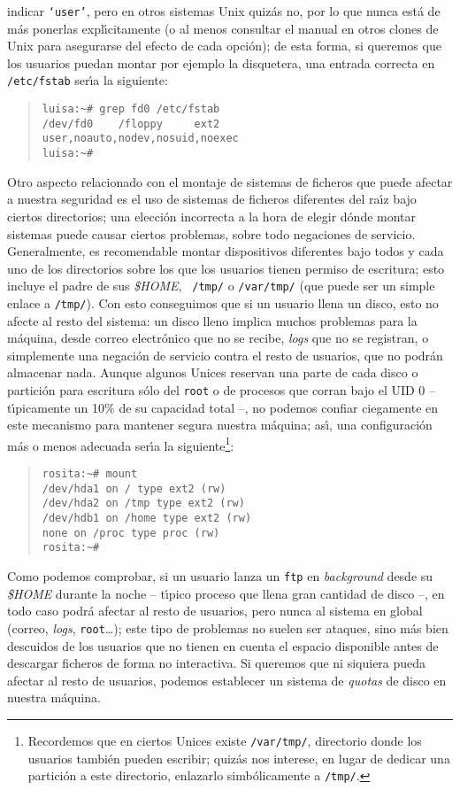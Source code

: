indicar {\tt `user'}, pero en otros sistemas Unix quiz\'as no, por lo que
nunca est\'a de m\'as ponerlas expl\'{\i}citamente (o al menos consultar el
manual en otros clones de Unix para asegurarse del efecto de cada opci\'on);
de esta forma, si queremos que los usuarios puedan montar por ejemplo la
disquetera, una entrada correcta en {\tt /etc/fstab} ser\'{\i}a la siguiente:
\begin{quote}
\begin{verbatim}
luisa:~# grep fd0 /etc/fstab
/dev/fd0    /floppy     ext2        user,noauto,nodev,nosuid,noexec
luisa:~#
\end{verbatim}
\end{quote}
Otro aspecto relacionado con el montaje de sistemas de ficheros que puede 
afectar a nuestra seguridad es el uso de sistemas de ficheros diferentes del
ra\'{\i}z bajo ciertos directorios; una elecci\'on incorrecta a la hora de 
elegir d\'onde montar sistemas puede causar ciertos problemas, sobre todo 
negaciones de servicio. Generalmente, es recomendable montar dispositivos 
diferentes bajo todos y cada uno de los directorios sobre los que los usuarios
tienen permiso de escritura; esto incluye el padre de sus {\it \$HOME}, {\tt
/tmp/} o {\tt /var/tmp/} (que puede ser un simple enlace a {\tt /tmp/}). Con
esto conseguimos que si un usuario llena un disco, esto no afecte al resto
del sistema: un disco lleno implica muchos problemas para la m\'aquina, desde
correo electr\'onico que no se recibe, {\it logs} que no se registran, o 
simplemente una negaci\'on de servicio contra el resto de usuarios, que no 
podr\'an almacenar nada. Aunque algunos Unices reservan una parte de cada disco
o partici\'on para escritura s\'olo del {\tt root} o de procesos que corran bajo
el UID 0 -- t\'{\i}picamente un 10\% de su capacidad total --, no podemos
confiar ciegamente en este mecanismo para mantener segura nuestra m\'aquina;
as\'{\i}, una configuraci\'on m\'as o menos adecuada ser\'{\i}a la 
siguiente\footnote{Recordemos que en ciertos Unices existe {\tt /var/tmp/}, 
directorio donde los usuarios tambi\'en pueden escribir; quiz\'as nos interese,
en lugar de dedicar una partici\'on a este directorio, enlazarlo 
simb\'olicamente a {\tt /tmp/}.}:
\begin{quote}
\begin{verbatim}
rosita:~# mount
/dev/hda1 on / type ext2 (rw)
/dev/hda2 on /tmp type ext2 (rw)
/dev/hdb1 on /home type ext2 (rw)
none on /proc type proc (rw)
rosita:~#
\end{verbatim}
\end{quote}
Como podemos comprobar, si un usuario lanza un {\tt ftp} en {\it background}
desde su {\it \$HOME}
durante la noche -- t\'{\i}pico proceso que llena gran cantidad de disco --, en
todo caso podr\'a afectar al resto de usuarios, pero nunca al sistema en global
(correo, {\it logs}, {\tt root}\ldots); este tipo de problemas no suelen ser
ataques, sino m\'as bien descuidos de los usuarios que no tienen en cuenta 
el espacio disponible antes de descargar ficheros de forma no interactiva. Si
queremos que ni siquiera pueda afectar al resto de usuarios, podemos establecer
un sistema de {\it quotas} de disco en nuestra m\'aquina.
